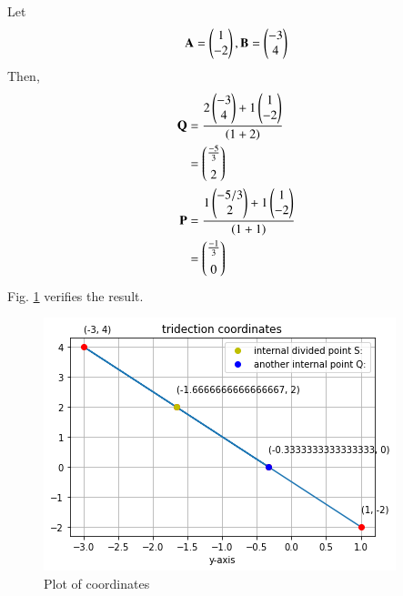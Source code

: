 Let 
%
\begin{align}
    \Vec{A}=\myvec{1\\-2},
    \Vec{B}=\myvec{-3\\4}
\end{align}
%
Then, 
\begin{align}
\mathbf{Q}&=\frac{2\begin{pmatrix}-3\\4\end{pmatrix}+1\begin{pmatrix}1\\-2\end{pmatrix}}{\left(1+2\right)}   \\
&
=\begin{pmatrix}\frac{-5}{3}\\[0.2cm]{2}\end{pmatrix}
\\
\mathbf{P}&=\frac{1\begin{pmatrix}-5/3\\2\end{pmatrix}+1\begin{pmatrix}1\\-2\end{pmatrix}}{\left(1+1\right)}   
\\
&=\begin{pmatrix}\frac{-1}{3} \\[0.2cm]{0}\end{pmatrix}
\end{align}
Fig. \ref{1/19/python fig1.png} verifies the result.
\begin{figure}[!ht]
\centering
\includegraphics[width=\columnwidth]{solutions/1/19/assignment.1.pythom plot.png}
\caption{ Plot of coordinates}
\label{1/19/python fig1.png}
\end{figure}


